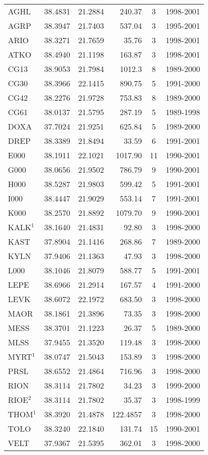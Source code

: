 \begin{extsum}
\begin{table}[H]
{\begin{center}
\begin{tabular*}{\linewidth}{@{\extracolsep{\fill}}l c c r c c}
AGHL & 38.4831 & 21.2884 &  240.37 & 3 & 1998-2001\\
AGRP & 38.3947 & 21.7403 &  537.04 & 3 & 1995-2001\\
ARIO & 38.3271 & 21.7659 &  35.76 & 3 & 1998-2001\\
ATKO & 38.4940 & 21.1198 &  163.87 & 3 & 1998-2001 \\
CG13 & 38.9053 & 21.7984 &  1012.3 & 8 & 1989-2000\\
CG30 & 38.3966 & 22.1415 &  890.75 & 5 & 1991-2000\\
CG42 & 38.2276 & 21.9728 &  753.83 & 8 & 1989-2000\\
CG61 & 38.0137 & 21.5795 &  287.19 & 5 & 1989-1998\\
DOXA & 37.7024 & 21.9251 &  625.84 & 5 & 1989-2000\\
DREP & 38.3389 & 21.8494 &  33.59 & 6 & 1991-2001\\
E000 & 38.1911 & 22.1021 &  1017.90 & 11 & 1990-2001\\
G000 & 38.0656 & 21.9502 &  786.79 & 9 & 1990-2001\\
H000 & 38.5287 & 21.9803 &  599.42 & 5 & 1991-2001\\
I000 & 38.4447 & 21.9029 &  553.14 & 7 & 1991-2001\\
K000 & 38.2570 & 21.8892 &  1079.70 & 9  & 1990-2001\\
KALK$^1$&38.1640&21.4831 & 92.80 & 3 & 1998-2000\\
KAST & 37.8904 & 21.1416 &  268.86 & 7 & 1989-2000\\
KYLN & 37.9406 & 21.1363 &  47.93 & 3 & 1998-2000\\
L000 & 38.1046 & 21.8079 &  588.77 & 5 & 1991-2001\\
LEPE & 38.6966 & 21.2914 &  167.57 & 4 & 1991-2000\\
LEVK & 38.6072 & 22.1972 &  683.50 & 3 & 1998-2000\\
MAOR & 38.1861 & 21.3896 &  73.35 & 3 & 1998-2000\\
MESS & 38.3701 & 21.1223 &  26.37 & 5 & 1989-2000\\
MLSS & 37.9455 & 21.3520 &  119.48 & 3 & 1998-2000\\
MYRT$^1$&38.0747& 21.5043& 153.89 & 3 & 1998-2000\\
PRSL & 38.6552 & 21.4864 &  716.96 & 3 & 1998-2000\\
RION & 38.3114 & 21.7802 &  34.23 & 3 & 1999-2000\\
RIOE$^2$&38.3114& 21.7802& 35.37 & 3 & 1998-1999\\
THOM$^1$&38.3920&21.4878&122.4857& 3 & 1998-2000\\
TOLO & 38.3240 & 22.1840 & 131.74 & 15 & 1990-2001\\
VELT & 37.9367 & 21.5395 & 362.01 & 3 & 1998-2000\\


\end{tabular*}
\end{center}}
\end{table}
\end{extsum}
